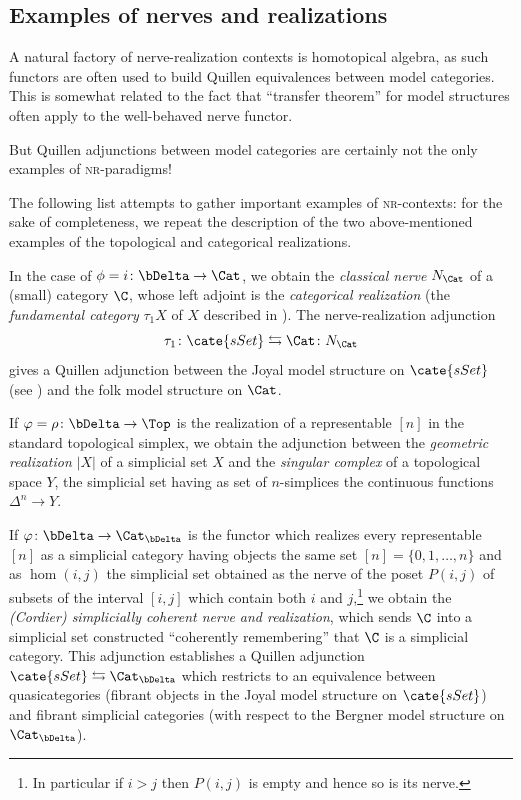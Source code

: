 \subsection{Examples of nerves and realizations}
A natural factory of nerve\hyp{}realization contexts is homotopical algebra, as such functors are often used to build Quillen equivalences between model categories. This is somewhat related to the fact that ``transfer theorem'' for model structures often apply to the well-behaved nerve functor.

But Quillen adjunctions between model categories are certainly not the only examples of \textsc{nr}-paradigms!

The following list attempts to gather important examples of \textsc{nr}-contexts: for the sake of completeness, we repeat the description of the two above-mentioned examples of the topological and categorical realizations.
\begin{example}\label{catnerve}
In the case of $\phi = i \colon \bDelta\to \Cat$, we obtain the \emph{classical nerve} $N_\Cat$ of a (small) category $\C$, whose left adjoint is the \emph{categorical realization} (the \emph{fundamental category} $\tau_1 X$ of $X$ described in \cite{joyal2002quasi}). The nerve\hyp{}realization adjunction
\[
\tau_1 \colon \cate{sSet}\leftrightarrows \Cat\colon N_{\Cat}
\]
gives a Quillen adjunction between the Joyal model structure on $\cate{sSet}$ (see \cite{joyal2002quasi}) and the folk model structure on $\Cat$.
\end{example}
\begin{example}\label{topnerve} 
If $\varphi = \rho \colon\bDelta\to \Top$ is the realization of a representable $[n]$ in the standard topological simplex, we obtain the adjunction between the \emph{geometric realization} $|X|$ of a simplicial set $X$ and the \emph{singular complex} of a topological space $Y$, \ie the simplicial set having as set of $n$-simplices the continuous functions $\Delta^n\to Y$.
\end{example}
\begin{example}
If $\varphi\colon \bDelta\to \Cat_{\bDelta}$ is the functor which realizes every representable $[n]$ as a simplicial category having objects the same set $[n]=\{0,1,\dots, n\}$ and as $\hom(i,j)$ 
the simplicial set obtained as the nerve of the poset $P(i,j)$ of subsets of the interval $[i,j]$ which contain both $i$ and $j$,\footnote{In particular if $i > j$ then $P(i,j)$ is empty and hence so is its nerve.} we obtain the \emph{(Cordier) simplicially coherent nerve and realization}, which sends $\C$ into a simplicial set constructed ``coherently remembering'' that $\C$ is a simplicial category. This adjunction establishes a Quillen adjunction $\cate{sSet}\leftrightarrows \Cat_{\bDelta}$ which restricts to an equivalence between quasicategories (fibrant objects in the Joyal model structure on $\cate{sSet}$) and fibrant simplicial categories (with respect to the Bergner model structure on $\Cat_{\bDelta}$).
\end{example}

